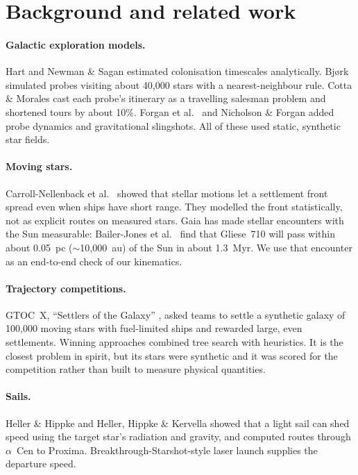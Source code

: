 \section{Background and related work}
\label{sec:related}

\paragraph{Galactic exploration models.} Hart \cite{hart1975explanation} and
Newman \& Sagan \cite{newman1981galactic} estimated colonisation timescales
analytically. Bj{\o}rk \cite{bjork2007exploring} simulated probes visiting about
40,000 stars with a nearest-neighbour rule. Cotta \& Morales
\cite{cotta2009computational} cast each probe's itinerary as a travelling
salesman problem and shortened tours by about 10\%. Forgan et al.\
\cite{forgan2013effect} and Nicholson \& Forgan \cite{nicholson2013slingshot}
added probe dynamics and gravitational slingshots. All of these used static,
synthetic star fields.

\paragraph{Moving stars.} Carroll-Nellenback et al.\ \cite{carroll2019fermi}
showed that stellar motions let a settlement front spread even when ships have
short range. They modelled the front statistically, not as explicit routes on
measured stars. Gaia has made stellar encounters with the Sun measurable:
Bailer-Jones et al.\ \cite{bailerjones2018encounters,bailerjones2022gl710}
find that Gliese~710 will pass within about 0.05~pc ($\sim$10,000~au) of the
Sun in about 1.3~Myr. We use that encounter as an end-to-end check of our
kinematics.

\paragraph{Trajectory competitions.} GTOC~X, ``Settlers of the Galaxy''
\cite{petropoulos2019gtocx}, asked teams to settle a synthetic galaxy of
100,000 moving stars with fuel-limited ships and rewarded large, even
settlements. Winning approaches combined tree search with heuristics. It is the
closest problem in spirit, but its stars were synthetic and it was scored for
the competition rather than built to measure physical quantities.

\paragraph{Sails.} Heller \& Hippke \cite{heller2017deceleration} and Heller,
Hippke \& Kervella \cite{heller2017optimized} showed that a light sail can
shed speed using the target star's radiation and gravity, and computed routes
through $\alpha$~Cen to Proxima. Breakthrough-Starshot-style laser launch
\cite{lubin2016roadmap} supplies the departure speed.

